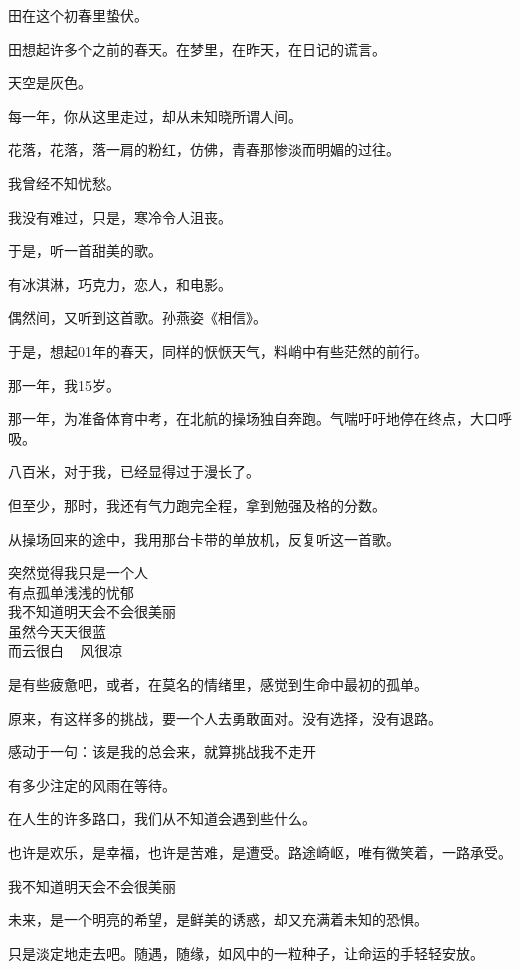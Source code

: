 		田在这个初春里蛰伏。\par
		田想起许多个之前的春天。在梦里，在昨天，在日记的谎言。\par
		天空是灰色。\par
		每一年，你从这里走过，却从未知晓所谓人间。\par
		花落，花落，落一肩的粉红，仿佛，青春那惨淡而明媚的过往。\par
		我曾经不知忧愁。

		我没有难过，只是，寒冷令人沮丧。\par
		于是，听一首甜美的歌。\par
		有冰淇淋，巧克力，恋人，和电影。

	\endwriting



		偶然间，又听到这首歌。孙燕姿《相信》。\par
		于是，想起01年的春天，同样的恹恹天气，料峭中有些茫然的前行。\par
		那一年，我15岁。\par
		那一年，为准备体育中考，在北航的操场独自奔跑。气喘吁吁地停在终点，大口呼吸。\par
		八百米，对于我，已经显得过于漫长了。\par
		但至少，那时，我还有气力跑完全程，拿到勉强及格的分数。\par
		从操场回来的途中，我用那台卡带的单放机，反复听这一首歌。

		\longpoem{}{}{}
			突然觉得我只是一个人 \\
			有点孤单浅浅的忧郁 \\
			我不知道明天会不会很美丽 \\
			虽然今天天很蓝 \\
			而云很白 ~ 风很凉
		\endlongpoem

		是有些疲惫吧，或者，在莫名的情绪里，感觉到生命中最初的孤单。\par
		原来，有这样多的挑战，要一个人去勇敢面对。没有选择，没有退路。\par
		感动于一句：该是我的总会来，就算挑战我不走开

		有多少注定的风雨在等待。\par
		在人生的许多路口，我们从不知道会遇到些什么。\par
		也许是欢乐，是幸福，也许是苦难，是遭受。路途崎岖，唯有微笑着，一路承受。

		我不知道明天会不会很美丽

		未来，是一个明亮的希望，是鲜美的诱惑，却又充满着未知的恐惧。\par
		只是淡定地走去吧。随遇，随缘，如风中的一粒种子，让命运的手轻轻安放。

